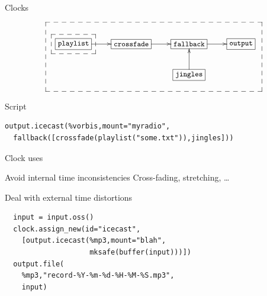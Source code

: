 \documentclass{beamer}
\begin{document}
\begin{frame}[fragile]{Clocks}

\[ \small
\xymatrix{
   *+[F]{\mathtt{playlist}}\ar[r]
   {\save "1,1"*+<10pt>[F--]\frm{} \restore}
   & *+[F]{\mathtt{crossfade}}\ar[r] &
      *+[F]{\mathtt{fallback}}\ar[r]& *+[F]{\mathtt{output}} \\
   & & *+[F]{\mathtt{jingles}}\ar[u]
   {\save "2,3"-<20pt>."1,4"."1,1"*+<20pt>[F--]\frm{} \restore}
   &
}
\]

\vfill

\begin{block}{Script}
\begin{lstlisting}
output.icecast(%vorbis,mount="myradio",
  fallback([crossfade(playlist("some.txt")),jingles]))
\end{lstlisting}
\end{block}

\end{frame}

\begin{frame}[fragile]{Clock uses}

\begin{block}{Avoid internal time inconsistencies}
\quad Cross-fading, stretching, \ldots
\end{block}

\vfill

\begin{block}{Deal with external time distortions}
\begin{lstlisting}
  input = input.oss()
  clock.assign_new(id="icecast",
    [output.icecast(%mp3,mount="blah",
                    mksafe(buffer(input)))])
  output.file(
    %mp3,"record-%Y-%m-%d-%H-%M-%S.mp3",
    input)
\end{lstlisting}
\end{block}

\end{frame}

\end{document}
